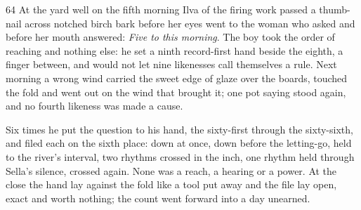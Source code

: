 \begin{CRchronicle}{64}
At the yard well on the fifth morning Ilva of the firing work passed a thumb-nail across notched birch bark before her eyes went to the woman who asked and before her mouth answered: \emph{Five to this morning}. The boy took the order of reaching and nothing else: he set a ninth record-first hand beside the eighth, a finger between, and would not let nine likenesses call themselves a rule. Next morning a wrong wind carried the sweet edge of glaze over the boards, touched the fold and went out on the wind that brought it; one pot saying stood again, and no fourth likeness was made a cause.

Six times he put the question to his hand, the sixty-first through the sixty-sixth, and filed each on the sixth place: down at once, down before the letting-go, held to the river’s interval, two rhythms crossed in the inch, one rhythm held through Sella’s silence, crossed again. None was a reach, a hearing or a power. At the close the hand lay against the fold like a tool put away and the file lay open, exact and worth nothing; the count went forward into a day unearned.
\end{CRchronicle}
